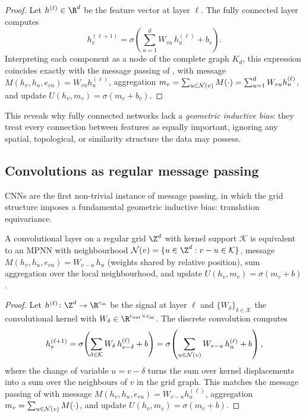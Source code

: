 \begin{proof}
Let $h^{(\ell)} \in \R^d$ be the feature vector at layer $\ell$. The fully
connected layer computes
\[
  h_v^{(\ell+1)} = \sigma\!\left(\sum_{u=1}^{d} W_{vu}\, h_u^{(\ell)} + b_v\right).
\]
Interpreting each component as a node of the complete graph $K_d$, this
expression coincides exactly with the message passing of
, with message $M(h_v, h_u, e_{vu}) = W_{vu} h_u^{(\ell)}$,
aggregation $m_v = \sum_{u \in \mathcal{N}(v)} M(\cdot) = \sum_{u=1}^d W_{vu} h_u^{(\ell)}$,
and update $U(h_v, m_v) = \sigma(m_v + b_v)$. \qedhere
\end{proof}

This reveals why fully connected networks lack a \emph{geometric inductive bias}:
they treat every connection between features as equally important, ignoring any
spatial, topological, or similarity structure the data may possess.

\subsection{Convolutions as regular message passing}
\label{subsec:priors:cnn-mpnn}

CNNs are the first non-trivial instance of message passing, in which the grid
structure imposes a fundamental geometric inductive bias: translation
equivariance.

\begin{proposition}
\label{prop:priors:cnn-mpnn}
A convolutional layer on a regular grid $\Z^d$ with kernel support $\mathcal{K}$
is equivalent to an MPNN with neighbourhood
$\Nb(v) = \{u \in \Z^d : v - u \in \mathcal{K}\}$, message
$M(h_v, h_u, e_{vu}) = W_{v-u}\, h_u$ (weights shared by relative position),
sum aggregation over the local neighbourhood, and update
$U(h_v, m_v) = \sigma(m_v + b)$.
\end{proposition}

\begin{proof}
Let $h^{(\ell)} \colon \Z^d \to \R^{c_{\mathrm{in}}}$ be the signal at layer
$\ell$ and $\{W_\delta\}_{\delta \in \mathcal{K}}$ the convolutional kernel with
$W_\delta \in \R^{c_{\mathrm{out}} \times c_{\mathrm{in}}}$. The discrete
convolution computes
\[
  h_v^{(\ell+1)}
    = \sigma\!\left(\sum_{\delta \in \mathcal{K}} W_\delta\, h_{v-\delta}^{(\ell)} + b\right)
    = \sigma\!\left(\sum_{u \in \mathcal{N}(v)} W_{v-u}\, h_u^{(\ell)} + b\right),
\]
where the change of variable $u = v - \delta$ turns the sum over kernel
displacements into a sum over the neighbours of $v$ in the grid graph. This
matches the message passing of  with message
$M(h_v, h_u, e_{vu}) = W_{v-u} h_u^{(\ell)}$, aggregation
$m_v = \sum_{u \in \mathcal{N}(v)} M(\cdot)$, and update $U(h_v, m_v) = \sigma(m_v + b)$.
\qedhere
\end{proof}

